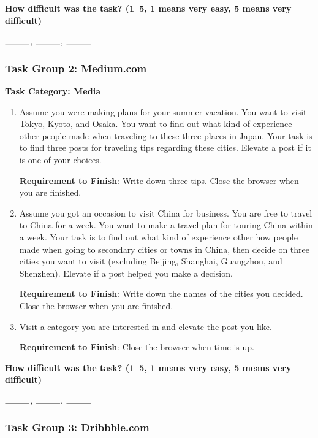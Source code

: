 \textbf{How difficult was the task? (1~5, 1 means very easy, 5 means very difficult)}

$\rule{1cm}{0.15mm}$, $\rule{1cm}{0.15mm}$, $\rule{1cm}{0.15mm}$

\subsubsection{Task Group 2: Medium.com}

\textbf{Task Category: Media}

\begin{enumerate}
    \item Assume you were making plans for your summer vacation. You want to visit Tokyo, Kyoto, and Osaka. 
          You want to find out what kind of experience other people made 
          when traveling to these three places in Japan. Your task is to find three posts 
          for traveling tips regarding these cities. Elevate a post if it is one of your choices.

          \textbf{Requirement to Finish}: Write down three tips.
          Close the browser when you are finished.

          \item Assume you got an occasion to visit China for business. You are free to travel to China for a week. 
          You want to make a travel plan for touring China within a week. Your task is to find out what kind 
          of experience other how people made when going to secondary cities or towns in China, then decide 
          on three cities you want to visit (excluding  Beijing, Shanghai, Guangzhou, and Shenzhen). 
          Elevate if a post helped you make a decision. 

          \textbf{Requirement to Finish}: Write down the names of the cities you decided. 
          Close the browser when you are finished.

    \item Visit a category you are interested in and elevate the post you like. 
    
          \textbf{Requirement to Finish}: Close the browser when time is up.
\end{enumerate}

\textbf{How difficult was the task? (1~5, 1 means very easy, 5 means very difficult)}

$\rule{1cm}{0.15mm}$, $\rule{1cm}{0.15mm}$, $\rule{1cm}{0.15mm}$

\subsubsection{Task Group 3: Dribbble.com}

